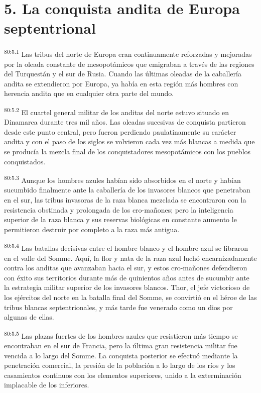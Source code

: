 \section*{5. La conquista andita de Europa septentrional}
\par
\textsuperscript{80:5.1} Las tribus del norte de Europa eran continuamente reforzadas y mejoradas por la oleada constante de mesopotámicos que emigraban a través de las regiones del Turquestán y el sur de Rusia. Cuando las últimas oleadas de la caballería andita se extendieron por Europa, ya había en esta región más hombres con herencia andita que en cualquier otra parte del mundo.

\par
\textsuperscript{80:5.2} El cuartel general militar de los anditas del norte estuvo situado en Dinamarca durante tres mil años. Las oleadas sucesivas de conquista partieron desde este punto central, pero fueron perdiendo paulatinamente su carácter andita y con el paso de los siglos se volvieron cada vez más blancas a medida que se producía la mezcla final de los conquistadores mesopotámicos con los pueblos conquistados.

\par
\textsuperscript{80:5.3} Aunque los hombres azules habían sido absorbidos en el norte y habían sucumbido finalmente ante la caballería de los invasores blancos que penetraban en el sur, las tribus invasoras de la raza blanca mezclada se encontraron con la resistencia obstinada y prolongada de los cro-mañones; pero la inteligencia superior de la raza blanca y sus reservas biológicas en constante aumento le permitieron destruir por completo a la raza más antigua.

\par
\textsuperscript{80:5.4} Las batallas decisivas entre el hombre blanco y el hombre azul se libraron en el valle del Somme. Aquí, la flor y nata de la raza azul luchó encarnizadamente contra los anditas que avanzaban hacia el sur, y estos cro-mañones defendieron con éxito sus territorios durante más de quinientos años antes de sucumbir ante la estrategia militar superior de los invasores blancos. Thor, el jefe victorioso de los ejércitos del norte en la batalla final del Somme, se convirtió en el héroe de las tribus blancas septentrionales, y más tarde fue venerado como un dios por algunas de ellas.

\par
\textsuperscript{80:5.5} Las plazas fuertes de los hombres azules que resistieron más tiempo se encontraban en el sur de Francia, pero la última gran resistencia militar fue vencida a lo largo del Somme. La conquista posterior se efectuó mediante la penetración comercial, la presión de la población a lo largo de los ríos y los casamientos continuos con los elementos superiores, unido a la exterminación implacable de los inferiores.

